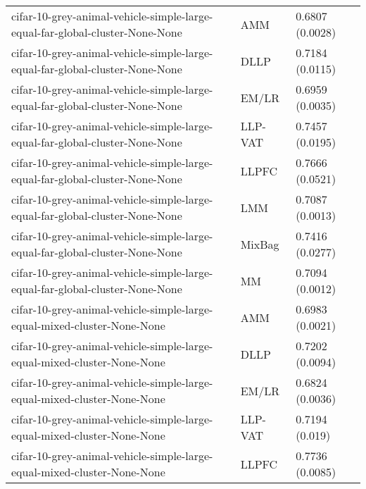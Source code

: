 \begin{longtable}{lll}
                                 cifar-10-grey-animal-vehicle-simple-large-equal-far-global-cluster-None-None &       AMM &                           0.6807 (0.0028) \\
                                 cifar-10-grey-animal-vehicle-simple-large-equal-far-global-cluster-None-None &      DLLP &                           0.7184 (0.0115) \\
                                 cifar-10-grey-animal-vehicle-simple-large-equal-far-global-cluster-None-None &     EM/LR &                           0.6959 (0.0035) \\
                                 cifar-10-grey-animal-vehicle-simple-large-equal-far-global-cluster-None-None &   LLP-VAT &                           0.7457 (0.0195) \\
                                 cifar-10-grey-animal-vehicle-simple-large-equal-far-global-cluster-None-None &     LLPFC &                           0.7666 (0.0521) \\
                                 cifar-10-grey-animal-vehicle-simple-large-equal-far-global-cluster-None-None &       LMM &                           0.7087 (0.0013) \\
                                 cifar-10-grey-animal-vehicle-simple-large-equal-far-global-cluster-None-None &    MixBag &                           0.7416 (0.0277) \\
                                 cifar-10-grey-animal-vehicle-simple-large-equal-far-global-cluster-None-None &        MM &                           0.7094 (0.0012) \\
                                      cifar-10-grey-animal-vehicle-simple-large-equal-mixed-cluster-None-None &       AMM &                           0.6983 (0.0021) \\
                                      cifar-10-grey-animal-vehicle-simple-large-equal-mixed-cluster-None-None &      DLLP &                           0.7202 (0.0094) \\
                                      cifar-10-grey-animal-vehicle-simple-large-equal-mixed-cluster-None-None &     EM/LR &                           0.6824 (0.0036) \\
                                      cifar-10-grey-animal-vehicle-simple-large-equal-mixed-cluster-None-None &   LLP-VAT &                            0.7194 (0.019) \\
                                      cifar-10-grey-animal-vehicle-simple-large-equal-mixed-cluster-None-None &     LLPFC &                           0.7736 (0.0085) \\

\end{longtable}
